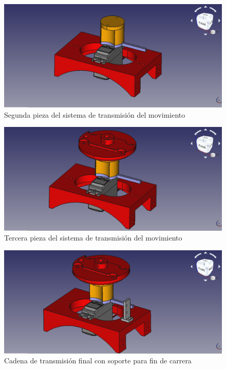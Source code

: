 \begin{figure}[H]
    \centering 
    \includegraphics[width=1\linewidth]{pictures/MotorMasSegundaPieza.png}
    \caption{Segunda pieza del sistema de transmisión del movimiento}
    \label{fig:segunda_pieza_sistema_transmision}
\end{figure}

\begin{figure}[H]
    \centering 
    \includegraphics[width=1\linewidth]{pictures/MotorMasTerceraPieza.png}
    \caption{Tercera pieza del sistema de transmisión del movimiento}
    \label{fig:tercera_pieza_sistema_transmision}
\end{figure}

\begin{figure}[H]
    \centering 
    \includegraphics[width=1\linewidth]{pictures/FinalDeCarrera.png}
    \caption{Cadena de transmisión final con soporte para fin de carrera}
    \label{fig:sistema_transmision_fin_carrera}
\end{figure}

